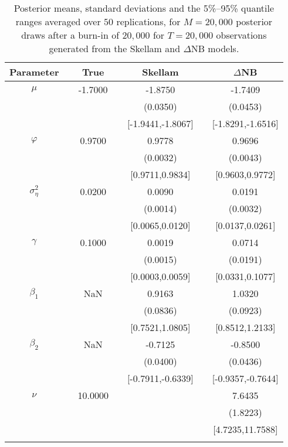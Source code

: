 { \renewcommand{\arraystretch}{1.2} 
\begin{table} 
\center 
\begin{tabular}{c cc cc cc} 
\toprule 
Parameter && True  && Skellam && $\Delta$NB \\ \hline  \hline
$\mu$   &&  -1.7000  &&  -1.8750  &&  -1.7409  \\  
 &&   &&  (0.0350)  &&  (0.0453)  \\  
 &&   &&  [-1.9441,-1.8067]  &&  [-1.8291,-1.6516]  \\ [1ex] 
$\varphi$   &&  0.9700  &&  0.9778  &&  0.9696  \\  
 &&   &&  (0.0032)  &&  (0.0043)  \\  
 &&   &&  [0.9711,0.9834]  &&  [0.9603,0.9772]  \\ [1ex] 
$\sigma^2_{\eta}$   &&  0.0200  &&  0.0090  &&  0.0191  \\  
 &&   &&  (0.0014)  &&  (0.0032)  \\  
 &&   &&  [0.0065,0.0120]  &&  [0.0137,0.0261]  \\ [1ex] 
$\gamma$   &&  0.1000  &&  0.0019  &&  0.0714  \\  
 &&   &&  (0.0015)  &&  (0.0191)  \\  
 &&   &&  [0.0003,0.0059]  &&  [0.0331,0.1077]  \\ [1ex] 
$\beta_1$   &&     NaN  &&  0.9163  &&  1.0320  \\  
 &&   &&  (0.0836)  &&  (0.0923)  \\  
 &&   &&  [0.7521,1.0805]  &&  [0.8512,1.2133]  \\ [1ex] 
$\beta_2$   &&     NaN  &&  -0.7125  &&  -0.8500  \\  
 &&   &&  (0.0400)  &&  (0.0436)  \\  
 &&   &&  [-0.7911,-0.6339]  &&  [-0.9357,-0.7644]  \\ [1ex] 
$\nu$   &&  10.0000  &&    &&  7.6435  \\  
 &&   &&    &&  (1.8223)  \\  
 &&   &&   &&  [4.7235,11.7588]  \\ [1ex] 
 \\  \hline 
\end{tabular}
 \caption{Posterior means, standard deviations and the 5\%--95\% quantile ranges averaged over $50$ replications,  for $M=20,000$ posterior draws after a burn-in of $20,000$ for $T=20,000$ observations  generated from the Skellam and $\Delta$NB models.}
\label{tab:sim_res} 
\end{table}
}